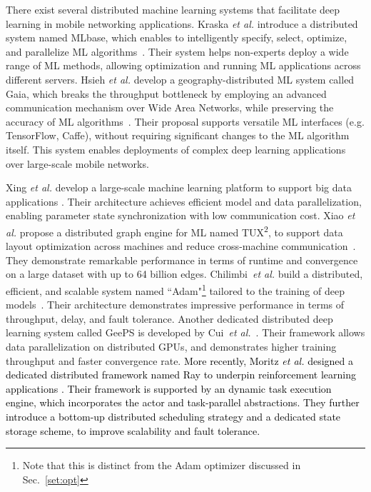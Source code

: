 \documentclass[journal,comsoc,letter]{IEEEtran}
\newcommand{\rev}[1]{\textcolor{black}{#1}}
\begin{document}
There exist several distributed machine learning systems that facilitate deep learning in mobile networking applications. Kraska \emph{et al.} introduce a distributed system named MLbase, which enables to intelligently specify, select, optimize, and parallelize ML algorithms~\cite{kraska2013mlbase}. Their system helps non-experts deploy a wide range of ML methods, allowing optimization and running ML applications across different servers. Hsieh \emph{et al.} develop a geography-distributed ML system called Gaia, which breaks the throughput bottleneck by employing an advanced communication mechanism over Wide Area Networks, while preserving the accuracy of ML algorithms~\cite{hsieh2017gaia}. Their proposal supports versatile ML interfaces (e.g. TensorFlow, Caffe), without requiring significant changes to the ML algorithm itself. This system enables deployments of complex deep learning applications over large-scale mobile networks. 

Xing \emph{et al.} develop a large-scale machine learning platform to support big data applications \cite{xing2015petuum}. Their architecture achieves efficient model and data parallelization, enabling parameter state synchronization with low communication cost. Xiao \emph{et al.} propose a distributed graph engine for ML named TUX\textsuperscript{2}, to support data layout optimization across machines and reduce cross-machine communication~\cite{xiao2017tux2}. They demonstrate remarkable performance in terms of runtime and convergence on a large dataset with up to 64 billion edges. Chilimbi~\emph{et al.} build a distributed, efficient, and scalable system named ``Adam"\footnote{Note that this is distinct from the Adam optimizer discussed in Sec.~\ref{set:opt}} tailored to the training of deep models~\cite{chilimbi2014project}. Their architecture demonstrates impressive performance in terms of throughput, delay, and fault tolerance. Another dedicated distributed deep learning system called GeePS is developed by Cui~\emph{et al.}~\cite{cui2016geeps}. Their framework allows data parallelization on distributed GPUs, and demonstrates higher training throughput and faster convergence rate.
\rev{More recently, Moritz \emph{et al.} designed a dedicated distributed framework named Ray to underpin reinforcement learning applications \cite{moritz2018ray}. Their framework is supported by an dynamic task execution engine, which incorporates the actor and task-parallel abstractions. They further introduce a bottom-up distributed scheduling strategy and a dedicated state storage scheme, to improve scalability and fault tolerance.}
\end{document}
